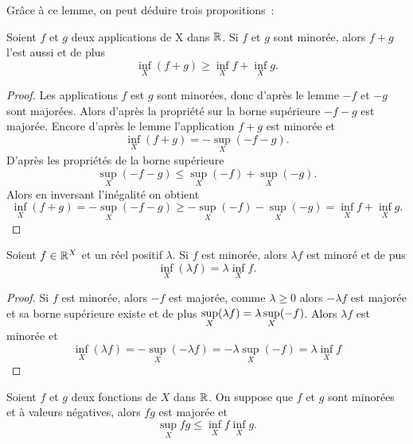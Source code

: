 Grâce à ce lemme, on peut déduire trois propositions~:
\begin{prop}
  Soient $f$ et $g$ deux applications de X dans $\mathbb{R}$. Si $f$ et $g$ sont minorée, alors $f+g$ l'est aussi et de plus
  \begin{equation}
    \inf\limits_{X}(f+g) \geq \inf\limits_{X} f + \inf\limits_{X} g.
  \end{equation}
\end{prop}
\begin{proof}
  Les applications $f$ est $g$ sont minorées, donc d'après le lemme $-f$ et $-g$ sont majorées. Alors d'après la propriété sur la borne supérieure $-f-g$ est majorée. Encore d'après le lemme l'application $f+g$ est minorée et
  \begin{equation}
    \inf\limits_{X}(f+g)=-\sup\limits_{X}(-f-g).
  \end{equation}
  D'après les propriétés de la borne supérieure
  \begin{equation}
    \sup\limits_{X}(-f-g) \leq \sup\limits_{X}(-f) + \sup\limits_{X}(-g).
  \end{equation}
  Alors en inversant l'inégalité on obtient
  \begin{equation}
    \inf\limits_{X}(f+g) = - \sup\limits_{X}(-f-g) \geq -\sup\limits_{X}(-f) - \sup\limits_{X}(-g) = \inf\limits_{X} f + \inf\limits_{X} g.
  \end{equation}
\end{proof}
\begin{prop}
  Soient $f \in \mathbb{R}^X$ et un réel positif $\lambda$. Si $f$ est minorée, alors $\lambda f$ est minoré et de pus
  \begin{equation}
    \inf\limits_{X} (\lambda f) = \lambda \inf\limits_{X} f.
  \end{equation}
\end{prop}
\begin{proof}
  Si $f$ est minorée, alors $-f$ est majorée, comme $\lambda \geq 0$ alors $-\lambda f$ est majorée et sa borne supérieure existe et de plus $\sup\limits_{X}(\-\lambda f)=\lambda \sup\limits_{X}(-f)$. Alors $\lambda f$ est minorée et 
  \begin{equation}
    \inf\limits_{X}(\lambda f) = -\sup\limits_{X}(-\lambda f)=-\lambda\sup\limits_{X}(-f)= \lambda\inf\limits_{X} f
  \end{equation}
\end{proof}
\begin{prop}
  Soient $f$ et $g$ deux fonctions de $X$ dans $\mathbb{R}$. On suppose que $f$ et $g$ sont minorées et à valeurs négatives, alors $fg$ est majorée et
  \begin{equation}
    \sup\limits_{X} fg \leq \inf\limits_{X} f \inf\limits_{X} g.
  \end{equation}
\end{prop}

